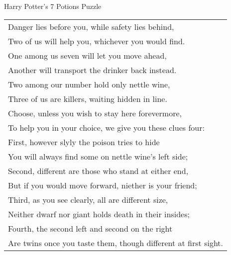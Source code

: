 \documentclass[14pt]{beamer}
\begin{document}
\begin{frame}{Harry Potter's 7 Potions Puzzle}
	\footnotesize
	\begin{tabular}{l}
		Danger lies before you, while safety lies behind, \\
		Two of us will help you, whichever you would find. \\
		One among us seven will let you move ahead, \\
		Another will transport the drinker back instead. \\
		Two among our number hold only nettle wine, \\
		Three of us are killers, waiting hidden in line. \\
		Choose, unless you wish to stay here forevermore, \\
		To help you in your choice, we give you these clues four: \\
		First, however slyly the poison tries to hide \\
		You will always find some on nettle wine's left side; \\
		Second, different are those who stand at either end, \\
		But if you would move forward, niether is your friend; \\
		Third, as you see clearly, all are different size, \\
		Neither dwarf nor giant holds death in their insides; \\
		Fourth, the second left and second on the right \\
		Are twins once you taste them, though different at first sight.	 \\
	\end{tabular}
\end{frame}
\end{document}
